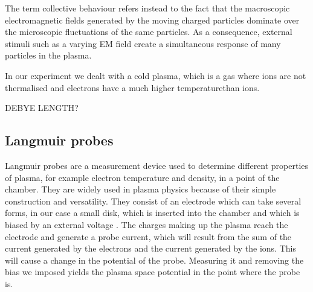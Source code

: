 The term collective behaviour refers instead to the fact that the macroscopic electromagnetic fields generated by the moving charged particles dominate over the microscopic fluctuations of the same particles.
As a consequence, external stimuli such as a varying EM field create a simultaneous response of many particles in the plasma.

In our experiment we dealt with a cold plasma, which is a gas where ions are not thermalised and electrons have a much higher temperaturethan ions. 

DEBYE LENGTH?

\subsection{Langmuir probes}
Langmuir probes are a measurement device used to determine different properties of plasma, for example electron temperature and density, in a point of the chamber.
They are widely used in plasma physics because of their simple construction and versatility.
They consist of an electrode which can take several forms, in our case a small disk, which is inserted into the chamber and which is biased by an external voltage \cite{piel_plasma_2017}.
The charges making up the plasma reach the electrode and generate a probe current, which will result from the sum of the current generated by the electrons and the current generated by the ions.
This will cause a change in the potential of the probe. Measuring it and removing the bias we imposed yields the plasma space potential in the point where the probe is.

